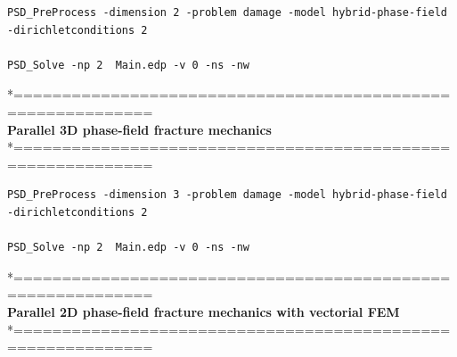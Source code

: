 \begin{lstlisting}[style=Linux]
PSD_PreProcess -dimension 2 -problem damage -model hybrid-phase-field -dirichletconditions 2   

PSD_Solve -np 2  Main.edp -v 0 -ns -nw   
\end{lstlisting}
*============================================================\\
\textbf{ Parallel 3D phase-field fracture mechanics} \\
*============================================================\\
\begin{lstlisting}[style=Linux]
PSD_PreProcess -dimension 3 -problem damage -model hybrid-phase-field -dirichletconditions 2   

PSD_Solve -np 2  Main.edp -v 0 -ns -nw   
\end{lstlisting}
*============================================================\\
\textbf{ Parallel 2D phase-field fracture mechanics with vectorial FEM } \\
*============================================================\\

